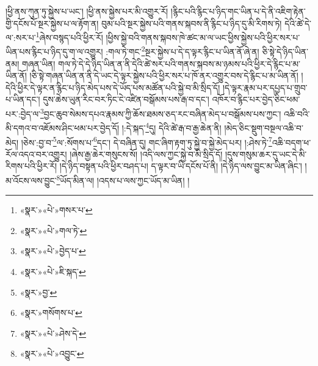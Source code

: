 །ཕྱི་ནས་ཀུན་ཏུ་སྐྱེས་པ་ཡང་། །ཕྱི་ནས་སྐྱེས་པར་མི་འགྱུར་རོ། །རྙིང་པའི་རྙིང་པ་ཉིད་གང་ཡིན་པ་དེ་ནི་འཇིག་རྟེན་གྱི་དངོས་པོ་སྔར་སྐྱེས་པ་ལ་རྟོག་ན། བུམ་པའི་སྔར་སྐྱེས་པའི་གནས་སྐབས་ནི་རྙིང་པ་ཉིད་དུ་མི་རིགས་ཏེ། དེའི་ཚེ་དེ་ལ་:སར་པ་\footnote{«སྣར་»«པེ་»གསར་པ་}ཞེས་བསྙད་པའི་ཕྱིར་རོ། །ཕྱིས་སྐྱེ་བའི་གནས་སྐབས་ཁེ་ཚང་མ་ལ་ཡང་ཕྱིས་སྐྱེས་པའི་ཕྱིར་སར་པ་ཡིན་པས་རྙིང་པ་ཉིད་དུ་ག་ལ་འགྱུར། :གལ་ཏེ་གང་\footnote{«སྣར་»«པེ་»གལ་ཏེ་}སྔར་སྐྱེས་པ་དེ་ད་ལྟར་རྙིང་པ་ཡིན་ནོ་ཞེ་ན། ཅི་སྟེ་དེ་ཉིད་ཡིན་ནམ། གཞན་ཡིན། གལ་ཏེ་དེ་དེ་ཉིད་ཡིན་ན་ནི་དེའི་ཚེ་སར་པའི་གནས་སྐབས་མ་ཉམས་པའི་ཕྱིར་དེ་རྙིང་པ་མ་ཡིན་ནོ། །ཅི་སྟེ་གཞན་ཡིན་ན་ནི་དེ་ཡང་དེ་ལྟར་སྐྱེས་པའི་ཕྱིར་སར་པ་ཁོ་ནར་འགྱུར་བས་དེ་རྙིང་པ་མ་ཡིན་ནོ། །དེའི་ཕྱིར་དེ་ལྟར་ན་རྙིང་པ་ཉིད་མེད་པས་དེ་ཡོད་པས་མཚོན་པའི་སྐྱེ་བ་མི་སྲིད་དོ། །དེ་ལྟར་རྣམ་པར་དཔྱད་པ་གྲུབ་པ་ཡིན་དང་། དུས་ཆེས་ཡུན་རིང་བར་ཏིང་ངེ་འཛིན་བསྒོམས་པས་རྒ་བ་དང་། འཁོར་བ་རྙིང་པར་བྱེད་ཅིང་ཕམ་པར་:བྱེད་ལ་\footnote{«སྣར་»«པེ་»བྱེད་པ་}བྱང་ཆུབ་སེམས་དཔའ་རྣམས་ཀྱི་ཆོས་ཐམས་ཅད་རང་བཞིན་མེད་པ་བསྒོམས་པས་ཀྱང་། འཆི་བའི་མི་དགའ་བ་འཇོམས་ཤིང་ཕམ་པར་བྱེད་དོ། །:དེ་སྐད་\footnote{«སྣར་»«པེ་»ཇི་སྐད་}དུ། དེའི་ཚེ་རྒ་བ་རྒྱ་ཆེན་ནི། །མེད་ཅིང་སྡུག་བསྔལ་འཆི་བ་མེད། །ཅེས་:བྱ་བ་\footnote{«སྣར་»བྱ་}ལ་:སོགས་པ་\footnote{«སྣར་»གསོགས་པ་}དང་། དེ་བཞིན་དུ། གང་ཞིག་རྟག་ཏུ་སྐྱེ་བ་སྐྱེ་མེད་པར། །:ཤེས་ཏེ་\footnote{«སྣར་»«པེ་»ཤེས་དེ་}འཆི་བདག་ཕ་རོལ་འདའ་བར་འགྱུར། །ཞེས་རྒྱ་ཆེར་གསུངས་སོ། །འདི་ལས་ཀྱང་སྐྱེ་བ་མི་སྲིད་དོ། །དུས་གསུམ་ཆར་དུ་ཡང་དེ་མི་རིགས་པའི་ཕྱིར་རོ། །དེ་ཉིད་བསྟན་པའི་ཕྱིར་བཤད་པ། ད་ལྟར་བ་ཡི་དངོས་པོ་ནི། །དེ་ཉིད་ལས་བྱུང་མ་ཡིན་ཞིང་། །མ་འོངས་ལས་བྱུང་\footnote{«སྣར་»«པེ་»འབྱུང་}ཡོད་མིན་ལ། །འདས་པ་ལས་ཀྱང་ཡོད་མ་ཡིན། །

